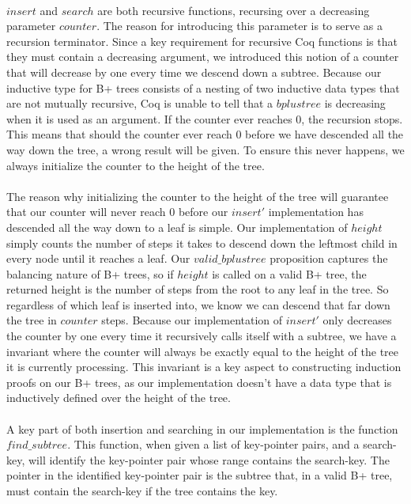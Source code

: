 \paragraph{}
$insert$ and $search$ are both recursive functions, recursing over a decreasing parameter $counter$. The reason for introducing this parameter is to serve as a recursion terminator. Since a key requirement for recursive Coq functions is that they must contain a decreasing argument, we introduced this notion of a counter that will decrease by one every time we descend down a subtree. Because our inductive type for B+ trees consists of a nesting of two inductive data types that are not mutually recursive, Coq is unable to tell that a $bplustree$ is decreasing when it is used as an argument. If the counter ever reaches $0$, the recursion stops. This means that should the counter ever reach $0$ before we have descended all the way down the tree, a wrong result will be given. To ensure this never happens, we always initialize the counter to the height of the tree.

\paragraph{}
The reason why initializing the counter to the height of the tree will guarantee that our counter will never reach $0$ before our $insert'$ implementation has descended all the way down to a leaf is simple. Our implementation of $height$ simply counts the number of steps it takes to descend down the leftmost child in every node until it reaches a leaf. Our $valid\_bplustree$ proposition captures the balancing nature of B+ trees, so if $height$ is called on a valid B+ tree, the returned height is the number of steps from the root to any leaf in the tree. So regardless of which leaf is inserted into, we know we can descend that far down the tree in $counter$ steps. Because our implementation of $insert'$ only decreases the counter by one every time it recursively calls itself with a subtree, we have a invariant where the counter will always be exactly equal to the height of the tree it is currently processing. This invariant is a key aspect to constructing induction proofs on our B+ trees, as our implementation doesn't have a data type that is inductively defined over the height of the tree.

\paragraph{}
A key part of both insertion and searching in our implementation is the function $find\_subtree$. This function, when given a list of key-pointer pairs, and a search-key, will identify the key-pointer pair whose range contains the search-key. The pointer in the identified key-pointer pair is the subtree that, in a valid B+ tree, must contain the search-key if the tree contains the key.

